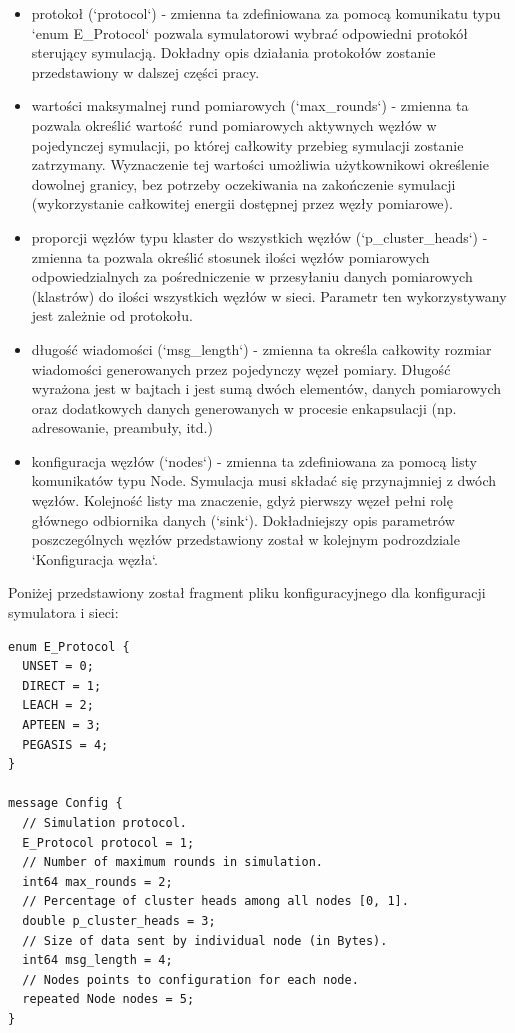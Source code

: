 \documentclass[a4paper,12pt,twoside,openany]{report}
\begin{document}
\begin{itemize}
 \item protokoł (`protocol`) - zmienna ta zdefiniowana za pomocą komunikatu typu `enum E\_Protocol` pozwala symulatorowi wybrać odpowiedni 
       protokół sterujący symulacją. Dokładny opis działania protokołów zostanie przedstawiony w dalszej części pracy.
 \item wartości maksymalnej rund pomiarowych (`max\_rounds`) - zmienna ta pozwala określić wartość rund pomiarowych aktywnych węzłów w pojedynczej symulacji, 
       po której całkowity przebieg symulacji zostanie zatrzymany.
       Wyznaczenie tej wartości umożliwia użytkownikowi określenie dowolnej granicy, bez potrzeby oczekiwania na zakończenie symulacji (wykorzystanie 
       całkowitej energii dostępnej przez węzły pomiarowe).
 \item proporcji węzłów typu klaster do wszystkich węzłów (`p\_cluster\_heads`) - zmienna ta pozwala określić stosunek ilości węzłów pomiarowych 
       odpowiedzialnych za pośredniczenie w przesyłaniu danych pomiarowych (klastrów) do ilości wszystkich węzłów w sieci. Parametr ten wykorzystywany jest
       zależnie od protokołu.
 \item długość wiadomości (`msg\_length`) - zmienna ta określa całkowity rozmiar wiadomości generowanych przez pojedynczy węzeł pomiary.
       Długość wyrażona jest w bajtach i jest sumą dwóch elementów, danych pomiarowych oraz dodatkowych danych generowanych w procesie enkapsulacji
       (np. adresowanie, preambuły, itd.)
 \item konfiguracja węzłów (`nodes`) - zmienna ta zdefiniowana za pomocą listy komunikatów typu Node. Symulacja musi składać się przynajmniej z dwóch węzłów.
       Kolejność listy ma znaczenie, gdyż pierwszy węzeł pełni rolę głównego odbiornika danych (`sink`).
       Dokładniejszy opis parametrów poszczególnych węzłów przedstawiony został w kolejnym podrozdziale `Konfiguracja węzła`. 
\end{itemize}

Poniżej przedstawiony został fragment pliku konfiguracyjnego dla konfiguracji symulatora i sieci:

\begin{lstlisting}
enum E_Protocol {
  UNSET = 0;
  DIRECT = 1;
  LEACH = 2;
  APTEEN = 3;
  PEGASIS = 4;
}

message Config {
  // Simulation protocol.
  E_Protocol protocol = 1;
  // Number of maximum rounds in simulation. 
  int64 max_rounds = 2;
  // Percentage of cluster heads among all nodes [0, 1].
  double p_cluster_heads = 3;
  // Size of data sent by individual node (in Bytes).
  int64 msg_length = 4;
  // Nodes points to configuration for each node.
  repeated Node nodes = 5;
}
\end{lstlisting}
\end{document}
